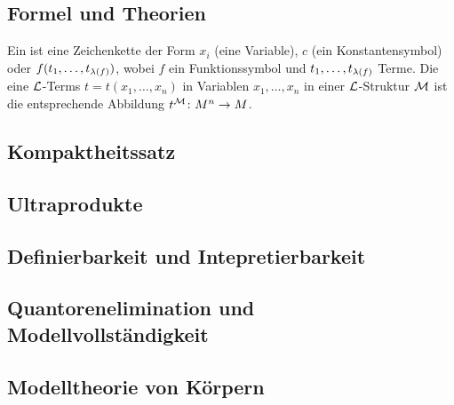\subsection{Formel und Theorien}
\begin{definition}
	Ein  ist eine Zeichenkette der Form $x_i$ (eine Variable), $c$ (ein Konstantensymbol) oder $f(t_1, \dots, t_{\lambda(f)})$, wobei $f$ ein Funktionssymbol und $t_1, \dots, t_{\lambda(f)}$ Terme. Die  eine $\mathcal L$-Terms $t = t(x_1,\dots, x_n)$ in Variablen $x_1, \dots, x_n$ in einer $\mathcal L$-Struktur $\mathcal M$ ist die entsprechende Abbildung $t^{\mathcal M}\colon M^n \to M$.
\end{definition}
\subsection{Kompaktheitssatz}

\subsection{Ultraprodukte}

\subsection{Definierbarkeit und Intepretierbarkeit}

\subsection{Quantorenelimination und Modellvollständigkeit}

\subsection{Modelltheorie von Körpern}